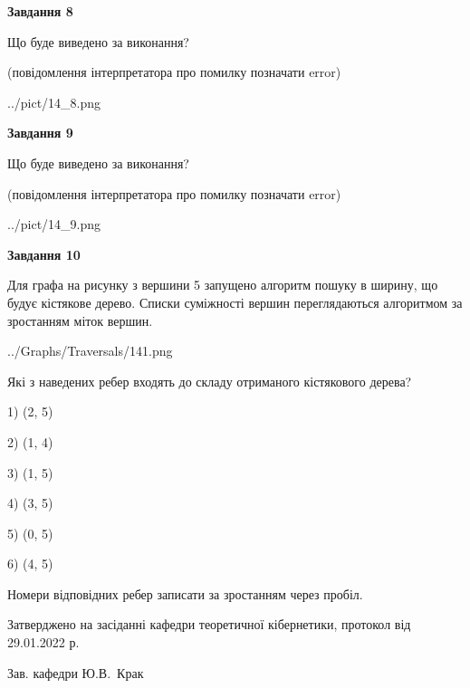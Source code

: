\documentclass[12pt, ukrainian]{article}
\begin{document}
{\begin {large}
{\begin {center}\textbf{Завдання 8}\end {center}}\par
Що буде виведено за виконання?\par
 (повідомлення інтерпретатора про помилку позначати error)
\begin{center}
	{../pict/14_8.png}
\end{center}
\newpage

{\begin {center}\textbf{Завдання 9}\end {center}}\par
Що буде виведено за виконання?\par
 (повідомлення інтерпретатора про помилку позначати error)\par
\begin{center}
	{../pict/14_9.png}
\end{center}
\newpage

{\begin {center}\textbf{Завдання 10}\end {center}}\par
Для графа на рисунку з вершини 5 запущено алгоритм пошуку в ширину, що будує кістякове дерево. Списки суміжності вершин переглядаються алгоритмом за зростанням міток вершин.\par
\begin{center}
	{../Graphs/Traversals/141.png}
\end{center}
\par Які з наведених ребер входять до складу отриманого кістякового дерева?\par
1) (2, 5)\par
2) (1, 4)\par
3) (1, 5)\par
4) (3, 5)\par
5) (0, 5)\par
6) (4, 5)\par
{\vskip 15pt} Номери відповідних ребер записати за зростанням через пробіл.\par
\newpage


\end {large}
}
{\smallskip \begin {small} Затверджено на засіданні кафедри теоретичної кібернетики, протокол  від   29.01.2022 р.\par\smallskip\smallskip
{\parbox {6.5 cm}{Зав. кафедри \dotfill Ю.В.~Крак}} \end{small}}
\end{document}
